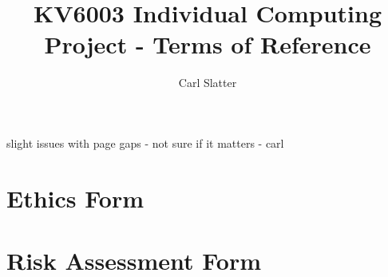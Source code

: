 \documentclass[12pt,a4paper]{article}
\title{ KV6003 Individual Computing Project - Terms of Reference }
\author{Carl Slatter}
\begin{document}
\maketitle



\todo slight issues with page gaps - not sure if it matters - carl
\section{Ethics Form}

 
\section{Risk Assessment Form}

\end{document}
